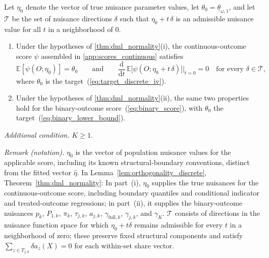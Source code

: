 \begin{lemma}\label{lem:orthogonality_discrete}
    Let $\eta_0$ denote the vector of true nuisance parameter values, let $\theta_0 = \underline{\theta}_{\omega,1}$, and let $\mathcal{T}$ be the set of nuisance directions $\delta$ such that $\eta_0 + t\,\delta$ is an admissible nuisance value for all $t$ in a neighborhood of $0$.
    \begin{enumerate}
        \item[\textup{(i)}] Under the hypotheses of \cref{thm:dml_normality}\textup{(i)}, the continuous-outcome score $\psi$ assembled in \cref{app:scores_continuous} satisfies
        \[
            \mathbb{E}[\psi(O;\eta_0)] = \theta_0
            \qquad\text{and}\qquad
            \frac{\mathrm{d}}{\mathrm{d}t}\,\mathbb{E}\bigl[\psi(O;\eta_0 + t\,\delta)\bigr]\Big|_{t=0} = 0
            \quad\text{for every } \delta \in \mathcal{T},
        \]
        where $\theta_0$ is the target~(\ref{eq:target_discrete_iv}).
        \item[\textup{(ii)}] Under the hypotheses of \cref{thm:dml_normality}\textup{(ii)}, the same two properties hold for the binary-outcome score~(\ref{eq:binary_score}), with $\theta_0$ the target~(\ref{eq:binary_lower_bound}).
    \end{enumerate}

\emph{Additional condition.} $K\geqslant1$.
\end{lemma}

\noindent\textit{Remark (notation).} $\eta_0$ is the vector of population nuisance values for the applicable score, including its known structural-boundary conventions, distinct from the fitted vector $\hat\eta$. In Lemma~\ref{lem:orthogonality_discrete}, Theorem~\ref{thm:dml_normality}: In part~\textup{(i)}, $\eta_0$ supplies the true nuisances for the continuous-outcome score, including boundary quantiles and conditional indicator and treated-outcome regressions; in part~\textup{(ii)}, it supplies the binary-outcome nuisances $p_k$, $P_{1,k}$, $\pi_k$, $\tau_{j,k}$, $a_{j,k}$, $\gamma_{\mathrm{full},k}$, $\gamma_{j,k}$, and $\gamma_K$. $\mathcal T$ consists of directions in the nuisance function space for which $\eta_0+t\delta$ remains admissible for every $t$ in a neighborhood of zero; these preserve fixed structural components and satisfy $\sum_{z\in T_{j,k}}\delta a_z(X)=0$ for each within-set share vector.


